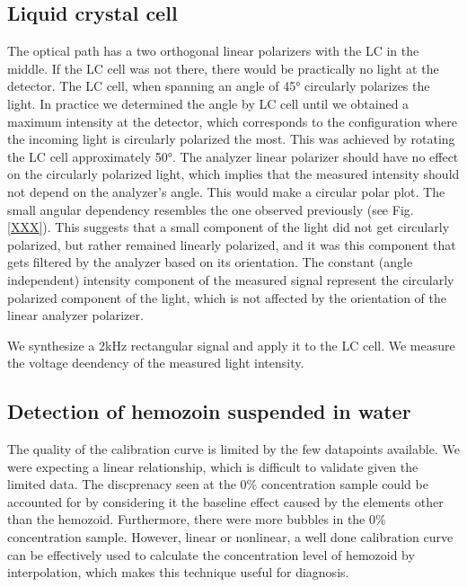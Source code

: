 \documentclass[12pt,a4paper]{article}
\begin{document}
\subsection{Liquid crystal cell}

 The optical path has a two orthogonal linear polarizers with the LC in the middle. If the LC cell was not there, there would be practically no light at the detector. The LC cell, when spanning an angle of 45° circularly polarizes the light. In practice we determined the angle by LC cell until we obtained a maximum intensity at the detector, which corresponds to the configuration where the incoming light is circularly polarized the most. This was achieved by rotating the LC cell approximately 50°. The analyzer linear polarizer should have no effect on the circularly polarized light, which implies that the measured intensity should not depend on the analyzer's angle. This would make a circular polar plot.
 The small angular dependency resembles the one observed previously (see Fig. \ref{XXX}). This suggests that a small component of the light did not get circularly polarized, but rather remained linearly polarized, and it was this component that gets filtered by the analyzer based on its orientation.
 The constant (angle independent) intensity component of the measured signal represent the circularly polarized component of the light, which is not affected by the orientation of the linear analyzer polarizer.



We synthesize a 2kHz rectangular signal and apply it to the LC cell. We measure the voltage deendency of the measured light intensity. 







\subsection{Detection of hemozoin suspended in water}





The quality of the calibration curve is limited by the few datapoints available. We were expecting a linear relationship, which is difficult to validate given the limited data. The discprenacy seen at the 0\% concentration sample could be accounted for by considering it the baseline effect caused by the elements other than the hemozoid. %
Furthermore, there were more bubbles in the 0\% concentration sample. However, linear or nonlinear, a well done calibration curve can be effectively used to calculate the concentration level of hemozoid by interpolation, which makes this technique useful for diagnosis.
\end{document}
